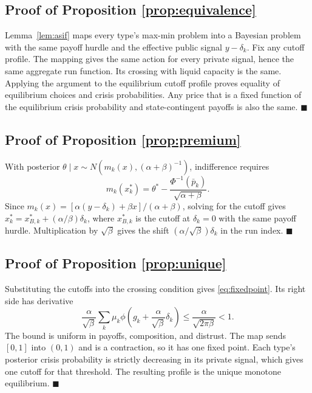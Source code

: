 \documentclass[11pt]{article}
\theoremstyle{definition}
\begin{document}
\subsection{Proof of Proposition \ref{prop:equivalence}}
Lemma~\ref{lem:asif} maps every type's max-min problem into a Bayesian problem with the same payoff hurdle and the effective public signal $y-\delta_k$. Fix any cutoff profile. The mapping gives the same action for every private signal, hence the same aggregate run function. Its crossing with liquid capacity is the same. Applying the argument to the equilibrium cutoff profile proves equality of equilibrium choices and crisis probabilities. Any price that is a fixed function of the equilibrium crisis probability and state-contingent payoffs is also the same. $\blacksquare$

\subsection{Proof of Proposition \ref{prop:premium}}
With posterior $\theta\mid x\sim N(m_k(x),(\alpha+\beta)^{-1})$, indifference requires
\[
m_k(x_k^*)=\theta^*-\frac{\Phi^{-1}(\bar p_k)}{\sqrt{\alpha+\beta}}.
\]
Since $m_k(x)=[\alpha(y-\delta_k)+\beta x]/(\alpha+\beta)$, solving for the cutoff gives $x_k^*=x_{B,k}^*+(\alpha/\beta)\delta_k$, where $x_{B,k}^*$ is the cutoff at $\delta_k=0$ with the same payoff hurdle. Multiplication by $\sqrt\beta$ gives the shift $(\alpha/\sqrt\beta)\delta_k$ in the run index. $\blacksquare$

\subsection{Proof of Proposition \ref{prop:unique}}
Substituting the cutoffs into the crossing condition gives \eqref{eq:fixedpoint}. Its right side has derivative
\[
\frac{\alpha}{\sqrt\beta}\sum_k\mu_k\phi\left(g_k+\frac{\alpha}{\sqrt\beta}\delta_k\right)
\leq \frac{\alpha}{\sqrt{2\pi\beta}}<1.
\]
The bound is uniform in payoffs, composition, and distrust. The map sends $[0,1]$ into $(0,1)$ and is a contraction, so it has one fixed point. Each type's posterior crisis probability is strictly decreasing in its private signal, which gives one cutoff for that threshold. The resulting profile is the unique monotone equilibrium. $\blacksquare$
\end{document}
